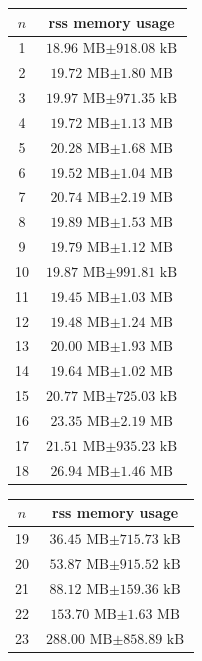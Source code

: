 \begin{table}[H]
    \centering
    \begin{tabular}{cc}
        $n$ & \gls{rss} memory usage \\
        \hline
        1 & $\text{18.96 MB} \pm \text{918.08 kB}$ \\
        2 & $\text{19.72 MB} \pm \text{1.80 MB}$ \\
        3 & $\text{19.97 MB} \pm \text{971.35 kB}$ \\
        4 & $\text{19.72 MB} \pm \text{1.13 MB}$ \\
        5 & $\text{20.28 MB} \pm \text{1.68 MB}$ \\
        6 & $\text{19.52 MB} \pm \text{1.04 MB}$ \\
        7 & $\text{20.74 MB} \pm \text{2.19 MB}$ \\
        8 & $\text{19.89 MB} \pm \text{1.53 MB}$ \\
        9 & $\text{19.79 MB} \pm \text{1.12 MB}$ \\
        10 & $\text{19.87 MB} \pm \text{991.81 kB}$ \\
        11 & $\text{19.45 MB} \pm \text{1.03 MB}$ \\
        12 & $\text{19.48 MB} \pm \text{1.24 MB}$ \\
        13 & $\text{20.00 MB} \pm \text{1.93 MB}$ \\
        14 & $\text{19.64 MB} \pm \text{1.02 MB}$ \\
        15 & $\text{20.77 MB} \pm \text{725.03 kB}$ \\
        16 & $\text{23.35 MB} \pm \text{2.19 MB}$ \\
        17 & $\text{21.51 MB} \pm \text{935.23 kB}$ \\
        18 & $\text{26.94 MB} \pm \text{1.46 MB}$ \\
    \end{tabular}
    \quad
    \begin{tabular}{cc}
        $n$ & \gls{rss} memory usage \\
        \hline
        19 & $\text{36.45 MB} \pm \text{715.73 kB}$ \\
        20 & $\text{53.87 MB} \pm \text{915.52 kB}$ \\
        21 & $\text{88.12 MB} \pm \text{159.36 kB}$ \\
        22 & $\text{153.70 MB} \pm \text{1.63 MB}$ \\
        23 & $\text{288.00 MB} \pm \text{858.89 kB}$ \\

\end{tabular}
\end{table}

